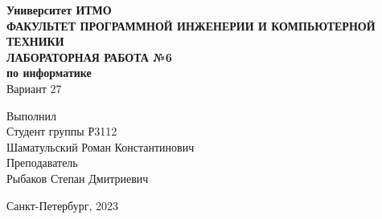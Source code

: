 \documentclass[12pt,a4paper]{article}
\begin{document}
\thispagestyle{empty}
\begin{center}
\Large{\textbf{Университет ИТМО}}\\
\hfill \break
\textbf{ФАКУЛЬТЕТ ПРОГРАММНОЙ ИНЖЕНЕРИИ И КОМПЬЮТЕРНОЙ ТЕХНИКИ}\\
\vspace{6.5cm}
\textbf{ЛАБОРАТОРНАЯ РАБОТА №6}\\
\textbf{по информатике}\\
Вариант 27\\
\end{center}
\vspace{5.5cm}
\begin{flushright}
Выполнил\\
Студент группы Р3112\\
Шаматульский Роман Константинович\\
Преподаватель\\
Рыбаков Степан Дмитриевич
\end{flushright}
\vspace{3cm}
\centering Санкт-Петербург, 2023
\end{document}
